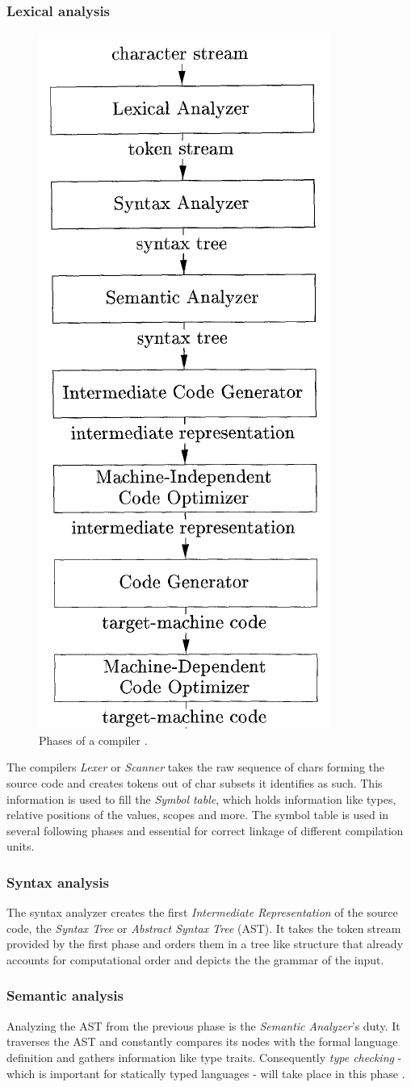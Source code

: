 \subsubsection{Lexical analysis}
\begin{figure}
	\begin{center}
		\includegraphics[width=.3\textwidth, height=0.45\textheight]{PICs/compiler_phases}
	\end{center}
	\caption{Phases of a compiler .}\label{compiler_phases}
\end{figure}
The compilers \textit{Lexer} or \textit{Scanner} takes the raw sequence of chars forming the source code and creates tokens out of char subsets it identifies as such. This information is used to fill the \textit{Symbol table}, which holds information like types, relative positions of the values, scopes and more. The symbol table is used in several following phases and essential for correct linkage of different compilation units.
\subsubsection{Syntax analysis}
The syntax analyzer creates the first \textit{Intermediate Representation} of the source code, the \textit{Syntax Tree} or \textit{Abstract Syntax Tree} (AST). It takes the token stream provided by the first phase and orders them in a tree like structure that already accounts for computational order and depicts the the grammar of the input.
\subsubsection{Semantic analysis}
Analyzing the AST from the previous phase is the \textit{Semantic Analyzer}'s duty. It traverses the AST and constantly compares its nodes with the formal language definition and gathers information like type traits. Consequently \textit{type checking} - which is important for statically typed languages - will take place in this phase .

